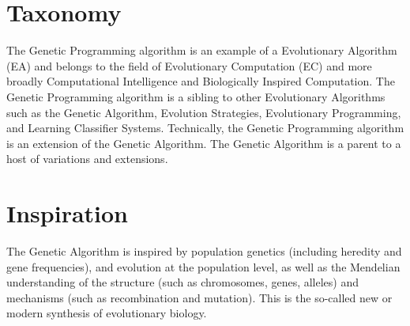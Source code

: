 \documentclass[a4paper, 11pt]{article}
\begin{document}
\section{Taxonomy}
\label{sec:taxonomy}
The Genetic Programming algorithm is an example of a Evolutionary Algorithm (EA) and belongs to the field of Evolutionary Computation (EC) and more broadly Computational Intelligence and Biologically Inspired Computation. 
The Genetic Programming algorithm is a sibling to other Evolutionary Algorithms such as the Genetic Algorithm, Evolution Strategies, Evolutionary Programming, and Learning Classifier Systems. Technically, the Genetic Programming algorithm is an extension of the Genetic Algorithm. The Genetic Algorithm is a parent to a host of variations and extensions.

\section{Inspiration}
\label{sec:inspiration}
The Genetic Algorithm is inspired by population genetics (including heredity and gene frequencies), and evolution at the population level, as well as the Mendelian understanding of the structure (such as chromosomes, genes, alleles) and mechanisms (such as recombination and mutation). This is the so-called new or modern synthesis of evolutionary biology. 
\end{document}

